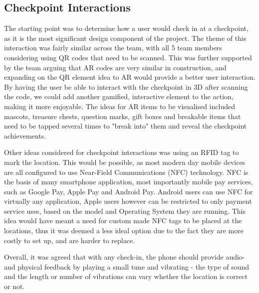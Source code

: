 \documentclass[10pt,twocolumn]{article} %
\begin{document}
\subsection*{Checkpoint Interactions}
The starting point was to determine how a user would check in at a checkpoint, as it is the most significant design component of the project. 
The theme of this interaction was fairly similar across the team, with all 5 team members considering using QR codes that need to be scanned. 
This was further supported by the team arguing that AR codes are very similar in construction, and expanding on the QR element idea to AR would provide a better user interaction. 
By having the user be able to interact with the checkpoint in 3D after scanning the code, we could add another gamified, interactive element to the action, making it more enjoyable. 
The ideas for AR items to be visualised included mascots, treasure chests, question marks, gift boxes and breakable items that need to be tapped several times to "break into" them and reveal the checkpoint achievements.

Other ideas considered for checkpoint interactions was using an RFID tag to mark the location. This would be possible, as most modern day mobile devices are all configured to use Near-Field Communications (NFC) technology. 
NFC is the basis of many smartphone application, most importantly mobile pay services, such as Google Pay, Apple Pay and Android Pay. Android users can use NFC for virtually any application, Apple users however can be restricted to only payment service uses, based on the model and Operating System they are running. 
This idea would have meant a need for custom made NFC tags to be placed at the locations, thus it was deemed a less ideal option due to the fact they are more costly to set up, and are harder to replace.

Overall, it was agreed that with any check-in, the phone should provide audio- and physical feedback by playing a small tune and vibrating - the type of sound and the length or number of vibrations can vary whether the location is correct or not.
\end{document}
